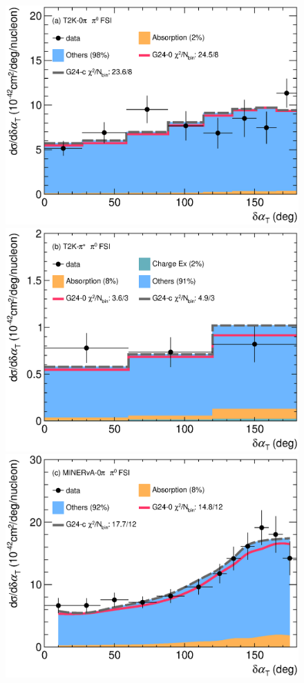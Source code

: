 \begin{figure}[!htb] 
    \centering 		
    \includegraphics[width=\dbfigwid\textwidth]{figures/tuning/0026-t2k_0pi_dalphat_pi0_decomp_covfix.eps}
    \includegraphics[width=\dbfigwid\textwidth]{figures/tuning/0026-t2k_pip_dalphat_pi0_decomp_covfix.eps}
    \includegraphics[width=\dbfigwid\textwidth]{figures/tuning/0026-min_0pi_dalphat_pi0_decomp_covfix.eps}

\end{figure}
